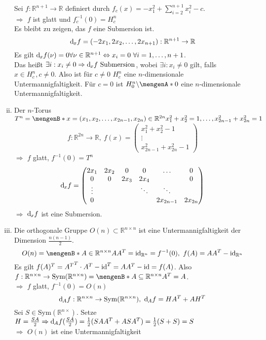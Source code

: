 \begin{enumerate}[(i)]
	Sei $f:\mathds{R}^{n+1} \to \mathds{R}$ definiert durch $f_c(x) = -x_1^2 + \sum_{i=2}^{n+1}x_i^2 - c$.\\
	$\Rightarrow$ $f$ ist glatt und $f_c^{-1}(0) = H_c^n$\\
	Es bleibt zu zeigen, das $f$ eine Submersion ist.
	\[
		\mathrm{d}\mkern-1.0mu_x f = (-2x_1,2x_2, \ldots,2x_{n+1}): \mathbb{R}^{n+1} \to \mathbb{R}	
	\]
	Es gilt $\mathrm{d}\mkern-1.0mu_x f(\nu) = 0 \forall \nu \in \mathbb{R}^{n+1} \Leftrightarrow x_i = 0\ \forall i=1, \ldots,n+1$.\\
Das heißt $\exists i: x_i \neq 0 \Rightarrow \mathrm{d}\mkern-1.0mu_x f\ \text{Submersion}$, wobei $\exists i: x_i \neq 0$ gilt, falls $x \in H_c^n, c \neq 0$. Also ist für $c \neq 0$ $H_c^n$ eine $n$-dimensionale Untermannigfaltigkeit. Für $c = 0$ ist $H_0^n \backslash \set{0}$ eine $n$-dimensionale Untermannigfaltigkeit.
	\item Der $n$-Torus $T^n = \set[x=(x_1,x_2, \ldots,x_{2n-1},x_{2n})\in \mathds{R}^{2n}]{x_1^2 + x_2^2 = 1, \ldots, x_{2n-1}^2 + x_{2n}^2 = 1}$
	\[
		f:\mathds{R}^{2n} \to \mathds{R},\ f(x) = 
		\begin{pmatrix}
			x_1^2 + x_2^2 - 1\\
			\vdots\\
			x_{2n-1}^2 + x_{2n}^2 - 1		
		\end{pmatrix}
	\]
	$\Rightarrow$ $f$ glatt, $f^{-1}(0)=T^n$
	\[
		\mathrm{d}\mkern-1.0mu_x f =
		\begin{pmatrix}
			2x_1 & 2x_2 & 0 & 0 &\ldots & 0\\
			0 & 0 & 2x_3 &2x_4 &  &0\\
			\vdots &&& \ddots &\ddots & \\
			0 &&&& 2x_{2n-1} & 2x_{2n}
		\end{pmatrix}
	\]
	$\Rightarrow$ $\mathrm{d}\mkern-1.0mu_x f$ ist eine Submersion.
	\item Die orthogonale Gruppe $O(n) \subset \mathds{R}^{n \times n}$ ist eine Untermannigfaltigkeit der Dimension $\frac{n(n-1)}{2}$.
	\[
		O(n) = \set[A \in \mathds{R}^{n \times n}]{AA^T = \id_{\mathds{R}^n} = f^{-1}(0)},\ f(A) = AA^T - \id_{\mathds{R}^n}
	\]
	Es gilt $f(A)^T = {A^T}^T \cdot A^T - \operatorname{id}^T = AA^T - \operatorname{id} = f(A)$. Also $f:\mathds{R}^{n \times n} \to \text{Sym}(\mathds{R}^{n \times n}) = \set[A \subseteq \mathds{R}^{n \times n}]{A^T = A}$.\\
	$\Rightarrow$ $f$ glatt, $f^{-1}(0) = O(n)$
	\[
		\mathrm{d}\mkern-1.0mu_A f:\mathbb{R}^{n \times n} \to \text{Sym}(\mathbb{R}^{n \times n}),\ \mathrm{d}\mkern-1.0mu_A f = HA^T+AH^T
	\]
	Sei $S \in \text{Sym}(\mathds{R}^{n \times})$. Setze $H = \frac{SA}{2} \Rightarrow \mathrm{d}\mkern-1.0mu_A f(\frac{SA}{2}) = \frac{1}{2}(SAA^T+ASA^T) = \frac{1}{2}(S +  S) = S$\\
	$\Rightarrow$ $O(n)$ ist eine Untermannigfaltigkeit
\end{enumerate}

